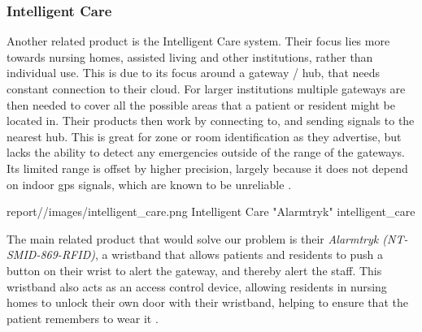 \subsubsection{Intelligent Care}



Another related product is the Intelligent Care system. Their focus lies more towards nursing homes, assisted living and other institutions, rather than individual use. This is due to its focus around a gateway / hub, that needs constant connection to their cloud. For larger institutions multiple gateways are then needed to cover all the possible areas that a patient or resident might be located in. Their products then work by connecting to, and sending signals to the nearest hub. This is great for zone or room identification as they advertise, but lacks the ability to detect any emergencies outside of the range of the gateways. Its limited range is offset by higher precision, largely because it does not depend on indoor \gls{gps} signals, which are known to be unreliable \cite{noauthor_novo_nodate}.

    {report//images/intelligent_care.png}
    {Intelligent Care "Alarmtryk"}
    {intelligent_care}

The main related product that would solve our problem is their \textit{Alarmtryk (NT-SMID-869-RFID)}, a wristband that allows patients and residents to push a button on their wrist to alert the gateway, and thereby alert the staff. This wristband also acts as an access control device, allowing residents in nursing homes to unlock their own door with their wristband, helping to ensure that the patient remembers to wear it \cite{noauthor_novo_nodate}. 
